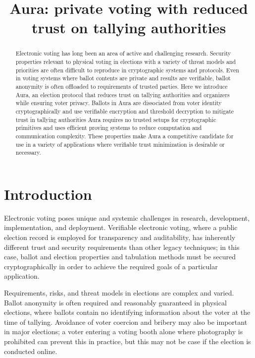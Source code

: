 \documentclass{llncs}
\begin{document}
\title{Aura: private voting with reduced trust on tallying authorities}
\author{}
\institute{}
\maketitle

\begin{abstract}
	Electronic voting has long been an area of active and challenging research.
	Security properties relevant to physical voting in elections with a variety of threat models and priorities are often difficult to reproduce in cryptographic systems and protocols.
    Even in voting systems where ballot contents are private and results are verifiable, ballot anonymity is often offloaded to requirements of trusted parties.
	Here we introduce Aura, an election protocol that reduces trust on tallying authorities and organizers while ensuring voter privacy.
	Ballots in Aura are dissociated from voter identity cryptographically and use verifiable encryption and threshold decryption to mitigate trust in tallying authorities
    Aura requires no trusted setups for cryptographic primitives and uses efficient proving systems to reduce computation and communication complexity.
	These properties make Aura a competitive candidate for use in a variety of applications where verifiable trust minimization is desirable or necessary.
\end{abstract}


\section{Introduction}

Electronic voting poses unique and systemic challenges in research, development, implementation, and deployment.
Verifiable electronic voting, where a public election record is employed for transparency and auditability, has inherently different trust and security requirements than other legacy techniques; in this case, ballot and election properties and tabulation methods must be secured cryptographically in order to achieve the required goals of a particular application.

Requirements, risks, and threat models in elections are complex and varied.
Ballot anonymity is often required and reasonably guaranteed in physical elections, where ballots contain no identifying information about the voter at the time of tallying.
Avoidance of voter coercion and bribery may also be important in major elections; a voter entering a voting booth alone where photography is prohibited can prevent this in practice, but this may not be case if the election is conducted online.
\end{document}
